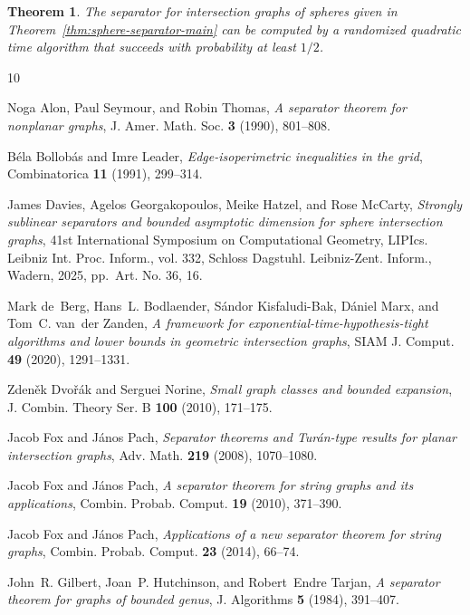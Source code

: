 \documentclass[11pt, reqno]{amsart}
\theoremstyle{plain}
\newtheorem{theorem}{Theorem}
\theoremstyle{definition}
\theoremstyle{remark}
\numberwithin{theorem}{section}
\numberwithin{equation}{section}
\begin{document}
\begin{theorem}
\label{thm:sphere-separator-alg}
The separator for intersection graphs of spheres given in Theorem~\ref{thm:sphere-separator-main} can be computed by a randomized quadratic time algorithm that succeeds with probability at least $1/2$.
\end{theorem}

% 
% 

\begin{thebibliography}{10}

Noga Alon, Paul Seymour, and Robin Thomas, \emph{A separator theorem for nonplanar graphs}, J. Amer. Math. Soc. \textbf{3} (1990), 801--808.

B\'ela Bollob\'as and Imre Leader, \emph{Edge-isoperimetric inequalities in the grid}, Combinatorica \textbf{11} (1991), 299--314.

James Davies, Agelos Georgakopoulos, Meike Hatzel, and Rose McCarty, \emph{Strongly sublinear separators and bounded asymptotic dimension for sphere intersection graphs}, 41st {I}nternational {S}ymposium on {C}omputational {G}eometry, LIPIcs. Leibniz Int. Proc. Inform., vol. 332, Schloss Dagstuhl. Leibniz-Zent. Inform., Wadern, 2025, pp.~Art. No. 36, 16.

Mark de~Berg, Hans~L. Bodlaender, S\'{a}ndor Kisfaludi-Bak, D\'{a}niel Marx, and Tom~C. van~der Zanden, \emph{A framework for exponential-time-hypothesis-tight algorithms and lower bounds in geometric intersection graphs}, SIAM J. Comput. \textbf{49} (2020), 1291--1331.

Zden\v{e}k Dvo\v{r}\'ak and Serguei Norine, \emph{Small graph classes and bounded expansion}, J. Combin. Theory Ser. B \textbf{100} (2010), 171--175.

Jacob Fox and J\'{a}nos Pach, \emph{Separator theorems and {T}ur\'{a}n-type results for planar intersection graphs}, Adv. Math. \textbf{219} (2008), 1070--1080.

Jacob Fox and J\'{a}nos Pach, \emph{A separator theorem for string graphs and its applications}, Combin. Probab. Comput. \textbf{19} (2010), 371--390.

Jacob Fox and J\'{a}nos Pach, \emph{Applications of a new separator theorem for string graphs}, Combin. Probab. Comput. \textbf{23} (2014), 66--74.

John~R. Gilbert, Joan~P. Hutchinson, and Robert~Endre Tarjan, \emph{A separator theorem for graphs of bounded genus}, J. Algorithms \textbf{5} (1984), 391--407.


\end{thebibliography}
\end{document}
